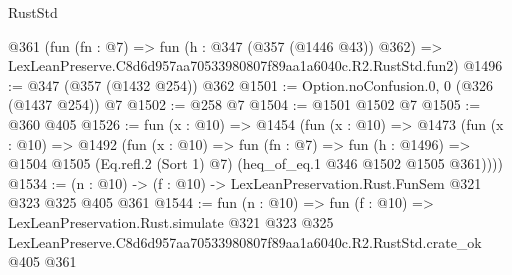 \begin{lexlean}{RustStd}
\begin{coremodule}
    @361
    (fun (fn : @7) =>
    fun (h : @347 (@357 (@1446 @43)) @362) =>
    LexLeanPreserve.C8d6d957aa70533980807f89aa1a6040c.R2.RustStd.fun2)
@1496 := @347 (@357 (@1432 @254)) @362
@1501 := Option.noConfusion.{0, 0} (@326 (@1437 @254)) @7
@1502 := @258 @7
@1504 := @1501 @1502 @7
@1505 := @360 @405
@1526 := fun (x : @10) =>
  @1454
    (fun (x : @10) =>
    @1473
      (fun (x : @10) =>
      @1492
        (fun (x : @10) =>
        fun (fn : @7) =>
        fun (h : @1496) =>
        @1504 @1505 (Eq.refl.{2} (Sort 1) @7) (heq_of_eq.{1} @346 @1502 @1505 @361))))
@1534 := (n : @10) -> (f : @10) -> LexLeanPreservation.Rust.FunSem @321 @323 @325 @405 @361
@1544 := fun (n : @10) =>
  fun (f : @10) =>
  LexLeanPreservation.Rust.simulate
    @321
    @323
    @325
    LexLeanPreserve.C8d6d957aa70533980807f89aa1a6040c.R2.RustStd.crate_ok
    @405
    @361
\end{coremodule}
\end{lexlean}
